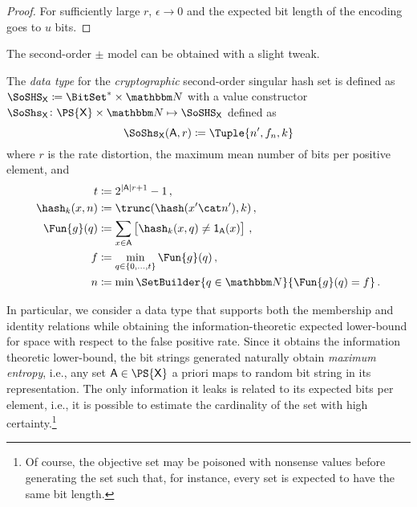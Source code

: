 \documentclass[ ../main.tex]{subfiles}
\begin{document}
\begin{proof}
    For sufficiently large $r$, $\epsilon \to 0$ and the expected bit length of the encoding goes to $u$ bits.
    
    
\end{proof}

The second-order $\pm$ model can be obtained with a slight tweak.

\begin{definition}
    \label{alg:makesecondorder}
    The \emph{data type} for the \emph{cryptographic} second-order singular hash set is defined as $\SoSHS_{\Set{X}} \coloneqq \BitSet^* \times \NatSet$ with a value constructor $\SoShs_{\Set{X}} \colon \PS{\Set{X}} \times \NatSet \mapsto \SoSHS_{\Set{X}}$ defined as
    \begin{equation}
        \SoShs_{\Set{X}}(\Set{A},r) \coloneqq \Tuple{n',f_n,k}
    \end{equation}
    where $r$ is the rate distortion, the maximum mean number of bits per positive element, and
    \begin{equation}
        \begin{split}
            t			& \coloneqq 2^{\Card{\Set{A}} r+1}-1\,,\\
            \hash_k(x,n)& \coloneqq \trunc(\hash(x' \cat n'),k)\,,\\	
            \Fun{g}(q) 	& \coloneqq \sum_{{x \in \Set{A}}}\left[\hash_k(x,q) \neq \SetIndicator{\Set{A}}(x)\right]\,,\\
            f 			& \coloneqq \min_{q \in \{0,\ldots,t\}} \Fun{g}(q)\,,\\
            n			& \coloneqq \min \SetBuilder{q \in \NatSet}{\Fun{g}(q) = f}\,.\\	
        \end{split}
    \end{equation}
\end{definition}





In particular, we consider a data type that supports both the membership and identity relations while obtaining the information-theoretic expected lower-bound for space with respect to the false positive rate.
Since it obtains the information theoretic lower-bound, the bit strings generated naturally obtain \emph{maximum entropy}, i.e., any set $\Set{A} \in \PS{\Set{X}}$ a priori maps to random bit string in its representation.
The only information it leaks is related to its expected bits per element, i.e., it is possible to estimate the cardinality of the set with high certainty.\footnote{Of course, the objective set may be poisoned with nonsense values before generating the set such that, for instance, every set is expected to have the same bit length.}
\end{document}
